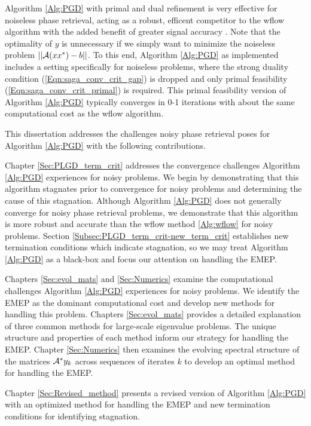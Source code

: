 Algorithm \ref{Alg:PGD} with primal and dual refinement is very effective for noiseless phase retrieval, acting as a robust, efficent competitor to the wflow algorithm with the added benefit of greater signal accuracy \cite[Section 5.1.1, 5.1.3]{DBLP:journals/siamsc/FriedlanderM16}.  Note that the optimality of $y$ is unnecessary if we simply want to minimize the noiseless problem $||{\mathcal A}(xx^*) - b||$.  To this end, Algorithm \ref{Alg:PGD} as implemented includes a setting specifically for noiseless problems, where the strong duality condition (\ref{Eqn:saga_conv_crit_gap}) is dropped and only primal feasibility (\ref{Eqn:saga_conv_crit_primal}) is required.  This primal feasibility version of Algorithm \ref{Alg:PGD} typically converges in 0-1 iterations with about the same computational cost as the wflow algorithm.  




This dissertation addresses the challenges noisy phase retrieval poses for Algorithm \ref{Alg:PGD} with the following contributions.


Chapter \ref{Sec:PLGD_term_crit} addresses the convergence challenges Algorithm \ref{Alg:PGD} experiences for noisy problems.  We begin by demonstrating that this algorithm stagnates prior to convergence for noisy problems and determining the cause of this stagnation.  Although Algorithm \ref{Alg:PGD} does not generally converge for noisy phase retrieval problems, we demonstrate that this algorithm is more robust and accurate than the wflow method \ref{Alg:wflow} for noisy problems.  Section \ref{Subsec:PLGD_term_crit-new_term_crit} establishes new termination conditions which indicate stagnation, so we may treat Algorithm \ref{Alg:PGD} as a black-box and focus our attention on handling the EMEP.


Chapters \ref{Sec:evol_mats} and \ref{Sec:Numerics} examine the computational challenges Algorithm \ref{Alg:PGD} experiences for noisy problems.  We identify the EMEP as the dominant computational cost and develop new methods for handling this problem.  Chapters \ref{Sec:evol_mats} provides a detailed explanation of three common methods for large-scale eigenvalue problems.  The unique structure and properties of each method inform our strategy for handling the EMEP.  Chapter \ref{Sec:Numerics} then examines the evolving spectral structure of the matrices ${\mathcal A}^*y_k$ across sequences of iterates $k$ to develop an optimal method for handling the EMEP.

Chapter \ref{Sec:Revised_method} presents a revised version of Algorithm \ref{Alg:PGD} with an optimized method for handling the EMEP and new termination conditions for identifying stagnation.

